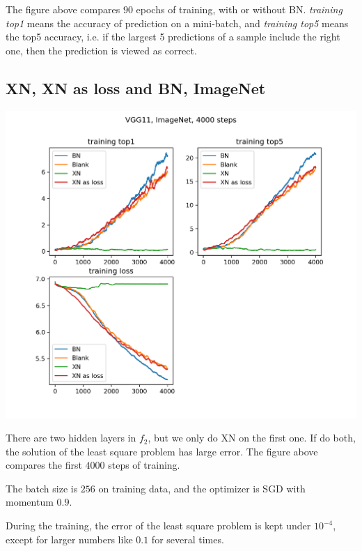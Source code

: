 The figure above compares $90$ epochs of training, with or without BN. \emph{training top1} means the accuracy of prediction on a mini-batch, and \emph{training top5} means the top5 accuracy, i.e. if the largest 5 predictions of a sample include the right one, then the prediction is viewed as correct.

\subsection{XN, XN as loss and BN, ImageNet}
\begin{center}
	\includegraphics*[width=\textwidth]{./figures/XN_ImageNet.png}
\end{center}

There are two hidden layers in $f_2$, but we only do XN on the first one. If do both, the solution of the least square problem has large error. The figure above compares the first $4000$ steps of training.

The batch size is $256$ on training data, and the optimizer is SGD with momentum $0.9$.

During the training, the error of the least square problem is kept under $10^{-4}$, except for larger numbers like $0.1$ for several times.
